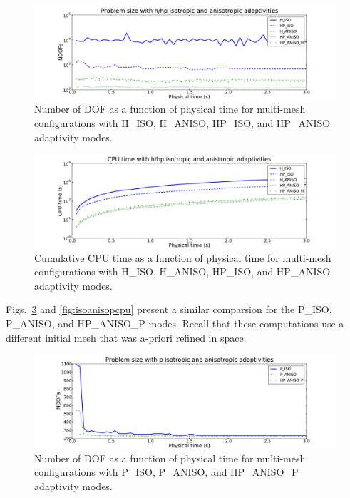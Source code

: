\begin{figure}[!ht]
  \begin{centering}
  \includegraphics[width=\columnwidth]{isoaniso_dof}
  \caption{\label{fig:isoanisodof} Number of DOF as a function of physical time for 
  multi-mesh configurations with H\_ISO, H\_ANISO,
  HP\_ISO, and HP\_ANISO adaptivity modes.}
  \end{centering}
\end{figure}

\begin{figure}[!ht]
  \begin{centering}
  \includegraphics[width=\columnwidth]{isoaniso_cpu}
  \caption{\label{fig:isoanisocpu} Cumulative CPU time as a function of physical time 
  for multi-mesh configurations with H\_ISO, H\_ANISO,
  HP\_ISO, and HP\_ANISO adaptivity modes.}
  \end{centering}
\end{figure}

\noindent
Figs.~\ref{fig:isoanisopdof} and \ref{fig:isoanisopcpu} present a similar 
comparsion for the P\_ISO, P\_ANISO, and HP\_ANISO\_P modes. Recall that these 
computations use a different initial mesh that was a-priori refined in space.

\newpage

\begin{figure}[!ht]
  \begin{centering}
  \includegraphics[width=\columnwidth]{isoanisop_dof}
  \caption{\label{fig:isoanisopdof} Number of DOF as a function of physical time
  for multi-mesh configurations with P\_ISO, P\_ANISO, and
  HP\_ANISO\_P adaptivity modes.}
  \end{centering}
\end{figure}

